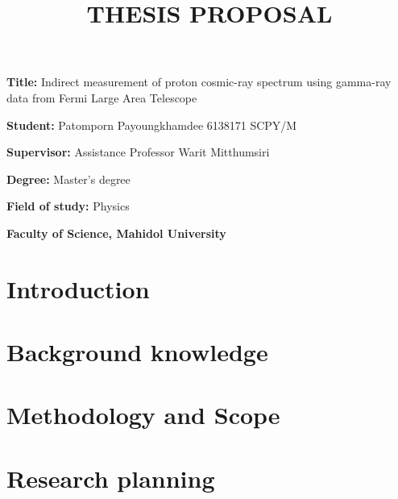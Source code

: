 \documentclass[12pt, a4paper]{article}
\title{THESIS PROPOSAL}
\author{}
\date{}
\newcommand{\namelistlabel}[1]{\mbox{#1}\hfil}
\newenvironment{namelist}[1]{%
\begin{list}{}
    {
        \let\makelabel\namelistlabel
        \settowidth{\labelwidth}{#1}
        \setlength{\leftmargin}{1.1\labelwidth}
    }
  }{%
\end{list}}
\begin{document}
\maketitle

\begin{namelist}{xxxxxxxxxxxx}
\item[{\bf Title:}]
  Indirect measurement of proton cosmic-ray spectrum using gamma-ray data from Fermi Large Area Telescope
\item[{\bf Student:}]
	Patomporn Payoungkhamdee 6138171 SCPY/M
\item[{\bf Supervisor:}]
	Assistance Professor Warit Mitthumsiri
\item[{\bf Degree:}]
	Master's degree
\item[{\bf Field of study:}]
	Physics
\item[{\bf Faculty of Science,  Mahidol University }]
\end{namelist}

\section{Introduction}


\section{Background knowledge}


\section{Methodology and Scope}


\section{Research planning}


% 
 
\end{document}
